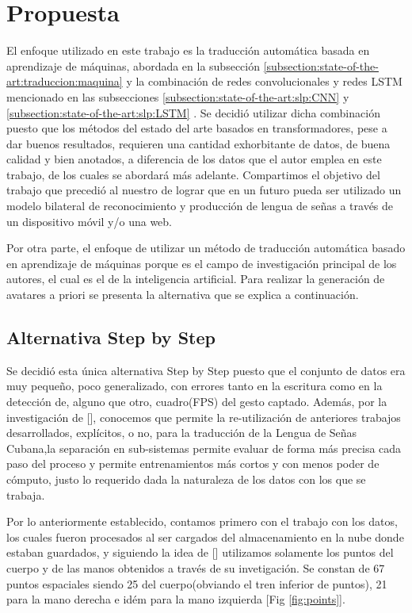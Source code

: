 \chapter{Propuesta}\label{chapter:proposal}
El enfoque utilizado en este trabajo es la traducción automática basada
en aprendizaje de máquinas, abordada en la subsección \ref{subsection:state-of-the-art:traduccion:maquina} y la combinación de redes convolucionales y redes LSTM mencionado en las subsecciones \ref{subsection:state-of-the-art:slp:CNN}  y \ref{subsection:state-of-the-art:slp:LSTM} .
Se decidió utilizar dicha combinación puesto que los métodos del estado del arte basados en transformadores, pese a dar buenos resultados, requieren una cantidad exhorbitante de datos, de buena calidad y bien anotados, a diferencia de los datos que el autor emplea en este trabajo, de los cuales se abordará más adelante. Compartimos el objetivo del trabajo que precedió al nuestro de lograr que en un futuro pueda ser utilizado un modelo bilateral de reconocimiento y producción de lengua de señas a  través de un dispositivo móvil y/o una web.

Por otra parte, el enfoque de utilizar un método de traducción automática basado
en aprendizaje de máquinas porque es el campo de investigación principal de los autores, el cual es el de la inteligencia artificial.
Para realizar la generación de avatares a priori se presenta la alternativa
que se explica a continuación.

\section{Alternativa Step by Step}\label{section:proposal:stepbystep}
Se decidió esta única alternativa Step by Step puesto que el conjunto de datos era muy pequeño, poco generalizado, con errores tanto en la escritura como en la detección de, alguno que otro, cuadro(FPS) del gesto captado. Además, por la investigación de [\cite{leynier-lsc-2021}], conocemos que permite la re-utilización de anteriores trabajos desarrollados, explícitos, o no, para la traducción de la Lengua de Señas Cubana,la separación en sub-sistemas permite evaluar de forma más precisa cada paso del proceso y  permite entrenamientos más cortos y con menos poder de cómputo, justo lo requerido dada la naturaleza de los datos con los que se trabaja.

Por lo anteriormente establecido, contamos primero con el trabajo con los datos, los cuales fueron procesados al ser cargados del almacenamiento en la nube donde estaban guardados, y siguiendo la idea de [\cite{leynier-lsc-2021}] utilizamos solamente los puntos del cuerpo y de las manos obtenidos a través de su invetigación. Se constan de 67 puntos espaciales siendo 25 del cuerpo(obviando el tren inferior de puntos), 21 para la mano derecha e idém para la mano izquierda [Fig \ref{fig:points}]. 

